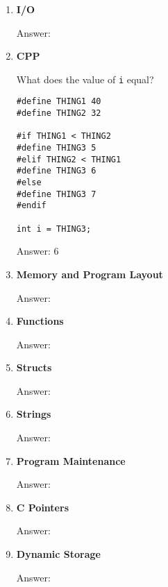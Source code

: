 \documentclass[11pt]{article}
\newenvironment{answer}{\large\lstset{basicstyle=\tiny\ttfamily}\color{white} \small{Answer:}}{}
\newenvironment{answer}{\large\lstset{basicstyle=\large\ttfamily}\color{red} \small{Answer:}}{}
\begin{document}
\begin{enumerate}
\begin{answer}
\end{answer}



\item \textbf{I/O}

\begin{answer}
\end{answer}



\item \textbf{CPP}

What does the value of \texttt{i} equal?
\begin{verbatim}
#define THING1 40
#define THING2 32

#if THING1 < THING2
#define THING3 5
#elif THING2 < THING1
#define THING3 6
#else
#define THING3 7
#endif

int i = THING3;
\end{verbatim}
\begin{answer}
6
\end{answer}



\item \textbf{Memory and Program Layout}

\begin{answer}
\end{answer}



\item \textbf{Functions}

\begin{answer}
\end{answer}



\item \textbf{Structs}

\begin{answer}
\end{answer}



\item \textbf{Strings}

\begin{answer}
\end{answer}



\item \textbf{Program Maintenance}

\begin{answer}
\end{answer}



\item \textbf{C Pointers}

\begin{answer}
\end{answer}



\item \textbf{Dynamic Storage}

\begin{answer}
\end{answer}




\end{enumerate}
\end{document}
